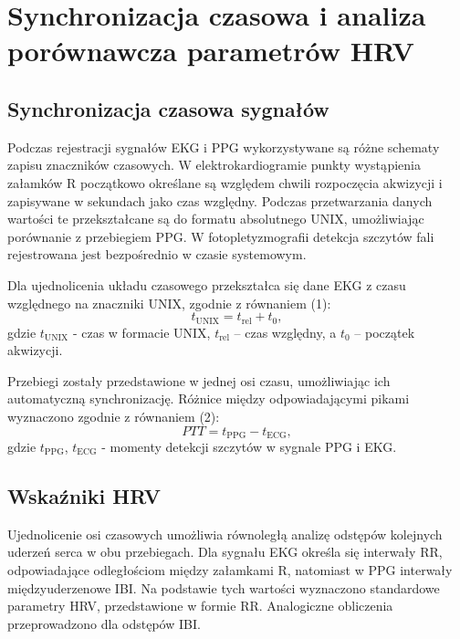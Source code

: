 \documentclass[journal]{IEEEtran}
\begin{document}
\section{Synchronizacja czasowa i analiza porównawcza parametrów HRV}

\subsection{Synchronizacja czasowa sygnałów}
Podczas rejestracji sygnałów EKG i PPG wykorzystywane są różne schematy zapisu znaczników czasowych. W elektrokardiogramie punkty wystąpienia załamków R początkowo określane są względem chwili rozpoczęcia akwizycji i zapisywane w sekundach jako czas względny. Podczas przetwarzania danych wartości te przekształcane są do formatu absolutnego UNIX, umożliwiając porównanie z przebiegiem PPG. W fotopletyzmografii detekcja szczytów fali rejestrowana jest bezpośrednio w czasie systemowym.

Dla ujednolicenia układu czasowego przekształca się dane EKG z czasu względnego na znaczniki UNIX, zgodnie z równaniem (1):
\begin{equation}
t_{\mathrm{UNIX}} = t_{\mathrm{rel}} + t_{0},
\end{equation}
gdzie $t_{\mathrm{UNIX}}$ - czas w formacie UNIX, $t_{\mathrm{rel}}$ – czas względny, a $t_{0}$ – początek akwizycji.

\newpage
Przebiegi zostały przedstawione w jednej osi czasu, umożliwiając ich automatyczną synchronizację. Różnice między odpowiadającymi pikami wyznaczono zgodnie z równaniem (2):
\begin{equation}
PTT = t_{\mathrm{PPG}} - t_{\mathrm{ECG}},
\end{equation}
gdzie $t_{\mathrm{PPG}}$, $t_{\mathrm{ECG}}$ - momenty detekcji szczytów w sygnale PPG i EKG. 


\subsection{Wskaźniki HRV}
Ujednolicenie osi czasowych umożliwia równoległą analizę odstępów kolejnych uderzeń serca w obu przebiegach. Dla sygnału EKG określa się interwały RR, odpowiadające odległościom między załamkami R, natomiast w PPG interwały międzyuderzenowe IBI. Na podstawie tych wartości wyznaczono standardowe parametry HRV, przedstawione w formie RR. Analogiczne obliczenia przeprowadzono dla odstępów IBI.
\end{document}
